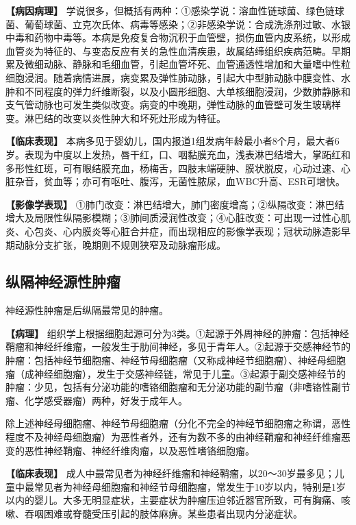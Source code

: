 \textbf{【病因病理】}
学说很多，但概括有两种：①感染学说：溶血性链球菌、绿色链球菌、葡萄球菌、立克次氏体、病毒等感染；②非感染学说：合成洗涤剂过敏、水银中毒和药物中毒等。本病是免疫复合物沉积于血管壁，损伤血管内皮系统，以形成血管炎为特征的、与变态反应有关的急性血清疾患，故属结缔组织疾病范畴。早期累及微细动脉、静脉和毛细血管，引起血管坏死、血管通透性增加和大量嗜中性粒细胞浸润。随着病情进展，病变累及弹性肺动脉，引起大中型肺动脉中膜变性、水肿和不同程度的弹力纤维断裂，以及小圆形细胞、大单核细胞浸润，少数肺静脉和支气管动脉也可发生类似改变。病变的中晚期，弹性动脉的血管壁可发生玻璃样变。淋巴结的改变以炎性肿大和坏死灶形成为特征。

\textbf{【临床表现】}
本病多见于婴幼儿，国内报道1组发病年龄最小者8个月，最大者6岁。表现为中度以上发热，唇干红，口、咽黏膜充血，浅表淋巴结增大，掌跖红和多形性红斑，可有眼结膜充血，杨梅舌，四肢末端硬肿、膜状脱皮，心动过速、心脏杂音，贫血等；亦可有呕吐、腹泻，无菌性脓尿，血WBC升高、ESR可增快。

\textbf{【影像学表现】}
①肺门改变：淋巴结增大，肺门密度增高；②纵隔改变：淋巴结增大及局限性纵隔影模糊；③肺间质浸润性改变；④心脏改变：可出现一过性心肌炎、心包炎、心内膜炎等心脏合并症，而出现相应的影像学表现；冠状动脉造影早期动脉分支扩张，晚期则不规则狭窄及动脉瘤形成。

\subsection{纵隔神经源性肿瘤}

神经源性肿瘤是后纵隔最常见的肿瘤。

\textbf{【病理】}
组织学上根据细胞起源可分为3类。①起源于外周神经的肿瘤：包括神经鞘瘤和神经纤维瘤，一般发生于肋间神经，多见于青年人。②起源于交感神经节的肿瘤：包括神经节细胞瘤、神经节母细胞瘤（又称成神经节细胞瘤）、神经母细胞瘤（成神经细胞瘤），发生于交感神经链，常见于儿童。③起源于副交感神经节的肿瘤：少见，包括有分泌功能的嗜铬细胞瘤和无分泌功能的副节瘤（非嗜铬性副节瘤、化学感受器瘤）两种，好发于成年人。

除上述神经母细胞瘤、神经节母细胞瘤（分化不完全的神经节细胞瘤之称谓，恶性程度不及神经母细胞瘤）为恶性者外，还有为数不多的由神经鞘瘤和神经纤维瘤恶变的恶性神经鞘瘤、神经纤维肉瘤，以及恶性嗜铬细胞瘤。

\textbf{【临床表现】}
成人中最常见者为神经纤维瘤和神经鞘瘤，以20～30岁最多见；儿童中最常见者为神经母细胞瘤和神经节母细胞瘤，常发生于10岁以内，特别是1岁以内的婴儿。大多无明显症状，主要症状为肿瘤压迫邻近器官所致，可有胸痛、咳嗽、吞咽困难或脊髓受压引起的肢体麻痹。某些患者出现内分泌症状。

